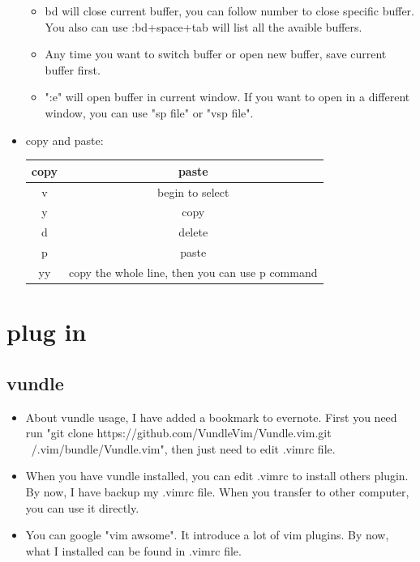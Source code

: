 \documentclass[a4paper,12pt,twoside]{book}
\begin{document}
\begin{itemize}
\begin{itemize}
			\item bd will close current buffer, you can follow number to close specific buffer. You also can use :bd+space+tab will list all the avaible buffers.
			\item Any time you want to switch buffer or open new buffer, save current buffer first.
			\item ":e" will open buffer in current window. If you want to open in a different window, you can use "sp file" or "vsp file".
	\end{itemize}

    
    \item copy and paste:
    
    \begin{center}
        \begin{tabular}{c|c}
		copy & paste\\
		\hline v & begin to select\\
		y & copy\\
		d & delete\\
		p & paste \\
		yy & copy the whole line, then you can use p command  \\
		
			\end{tabular}
	\end{center}
		
\end{itemize}

\section{plug in}
\subsection{vundle}
\begin{itemize}
		\item About vundle usage, I have added a bookmark to evernote. First you need run "git clone https://github.com/VundleVim/Vundle.vim.git ~/.vim/bundle/Vundle.vim", then just need to edit .vimrc file.  

\item When you have vundle installed, you can edit .vimrc to install others plugin. By now, I have backup my .vimrc file. When you transfer to other computer, you can use it directly. 
		\item You can google "vim awsome". It introduce a lot of vim plugins. By now, what I installed can be found in .vimrc file. 
		\end{itemize}
\end{document}
